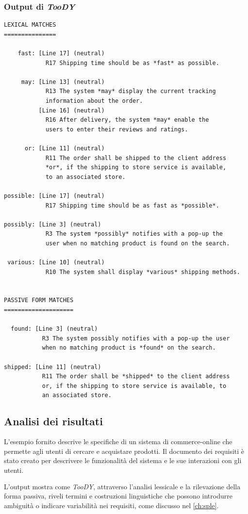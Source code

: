 \documentclass[12pt]{report}
\newcommand{\toody}{\textsl{TooDY}\xspace}
\begin{document}
\subsubsection{Output di \toody}
\begin{lstlisting}
LEXICAL MATCHES
===============

    fast: [Line 17] (neutral)
            R17 Shipping time should be as *fast* as possible.

     may: [Line 13] (neutral)
            R13 The system *may* display the current tracking
            information about the order.
          [Line 16] (neutral)
            R16 After delivery, the system *may* enable the
            users to enter their reviews and ratings.

      or: [Line 11] (neutral)
            R11 The order shall be shipped to the client address
            *or*, if the shipping to store service is available,
            to an associated store.

possible: [Line 17] (neutral)
            R17 Shipping time should be as fast as *possible*.

possibly: [Line 3] (neutral)
            R3 The system *possibly* notifies with a pop-up the
            user when no matching product is found on the search.

 various: [Line 10] (neutral)
            R10 The system shall display *various* shipping methods.


PASSIVE FORM MATCHES
====================

  found: [Line 3] (neutral)
           R3 The system possibly notifies with a pop-up the user
           when no matching product is *found* on the search.

shipped: [Line 11] (neutral)
           R11 The order shall be *shipped* to the client address
           or, if the shipping to store service is available, to
           an associated store.
\end{lstlisting}


\newpage
\subsection{Analisi dei risultati}
L'esempio fornito descrive le specifiche di un sistema di commerce-online che permette agli utenti di cercare e acquistare prodotti. Il documento dei requisiti è stato creato per descrivere le funzionalità del sistema e le sue interazioni con gli utenti.

L'output mostra come \toody, attraverso l'analisi lessicale e la rilevazione della forma passiva, riveli termini e costruzioni linguistiche che possono introdurre ambiguità o indicare variabilità nei requisiti, come discusso nel \cref{ch:sple}.
\end{document}
